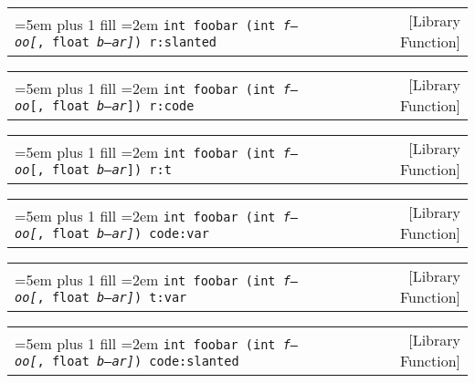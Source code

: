 \documentclass{book}
\newcommand\GNUTexinfocommandstyletextvar[1]{{\normalfont{}\textsl{#1}}}%
\begin{document}
%

\noindent\begin{tabularx}{\linewidth}{@{}Xr}
\rightskip=5em plus 1 fill
\hangindent=2em
\texttt{int foobar (int\ \GNUTexinfocommandstyletextvar{f---oo}\textnormal{\textsl{[}},\ float\ \GNUTexinfocommandstyletextvar{b--ar}\textnormal{\textsl{]}})\ r:slanted}& [Library Function]
\end{tabularx}

%

\noindent\begin{tabularx}{\linewidth}{@{}Xr}
\rightskip=5em plus 1 fill
\hangindent=2em
\texttt{int foobar (int\ \GNUTexinfocommandstyletextvar{f---oo}\textnormal{\texttt{[}},\ float\ \GNUTexinfocommandstyletextvar{b--ar}\textnormal{\texttt{]}})\ r:code}& [Library Function]
\end{tabularx}

%

\noindent\begin{tabularx}{\linewidth}{@{}Xr}
\rightskip=5em plus 1 fill
\hangindent=2em
\texttt{int foobar (int\ \GNUTexinfocommandstyletextvar{f---oo}\textnormal{\texttt{[}},\ float\ \GNUTexinfocommandstyletextvar{b--ar}\textnormal{\texttt{]}})\ r:t}& [Library Function]
\end{tabularx}

%

\noindent\begin{tabularx}{\linewidth}{@{}Xr}
\rightskip=5em plus 1 fill
\hangindent=2em
\texttt{int foobar (int\ \GNUTexinfocommandstyletextvar{f---oo}\texttt{\GNUTexinfocommandstyletextvar{[}},\ float\ \GNUTexinfocommandstyletextvar{b--ar}\texttt{\GNUTexinfocommandstyletextvar{]}})\ code:var}& [Library Function]
\end{tabularx}

%

\noindent\begin{tabularx}{\linewidth}{@{}Xr}
\rightskip=5em plus 1 fill
\hangindent=2em
\texttt{int foobar (int\ \GNUTexinfocommandstyletextvar{f---oo}\texttt{\GNUTexinfocommandstyletextvar{[}},\ float\ \GNUTexinfocommandstyletextvar{b--ar}\texttt{\GNUTexinfocommandstyletextvar{]}})\ t:var}& [Library Function]
\end{tabularx}

%

\noindent\begin{tabularx}{\linewidth}{@{}Xr}
\rightskip=5em plus 1 fill
\hangindent=2em
\texttt{int foobar (int\ \GNUTexinfocommandstyletextvar{f---oo}\texttt{\textsl{[}},\ float\ \GNUTexinfocommandstyletextvar{b--ar}\texttt{\textsl{]}})\ code:slanted}& [Library Function]
\end{tabularx}
\end{document}
